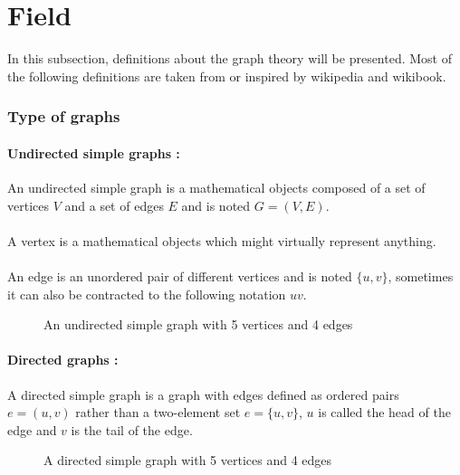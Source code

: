 \section{Field}
In this subsection, definitions about the graph theory will be presented. Most
of the following definitions are taken from or inspired by wikipedia and
wikibook.

\subsubsection{Type of graphs}
\paragraph{Undirected simple graphs :}
An undirected simple graph is a mathematical objects composed of a set of
vertices $V$ and a set of edges $E$ and is noted $G = (V,E)$.

\paragraph{}
A vertex is a mathematical objects which might virtually represent anything.

\paragraph{}
An edge is an unordered pair of different vertices and is noted $\{u,v\}$,
sometimes it can also be contracted to the following notation $uv$.

\begin{figure}[!h]
  \begin{center}
    
  \end{center}
  \caption{An undirected simple graph with 5 vertices and 4 edges}
\end{figure}

\paragraph{Directed graphs :} 
A directed simple graph is a graph with edges defined as ordered pairs
$e = (u,v)$ rather than a two-element set $e = \{u,v\}$, $u$ is called the
head of the edge and $v$ is the tail of the edge.
\begin{figure}[!h]
  \begin{center}
    
  \end{center}
  \caption{A directed simple graph with 5 vertices and 4 edges}
\end{figure}

